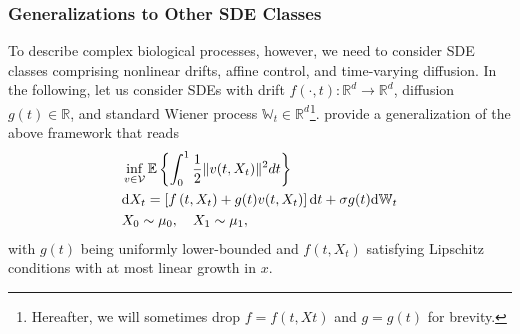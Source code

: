 \subsubsection*{Generalizations to Other SDE Classes}
To describe complex biological processes, however, we need to consider SDE classes comprising nonlinear drifts, affine control, and time-varying diffusion. 
In the following, let us consider SDEs with drift $f(\cdot, t): \mathbb{R}^d \rightarrow \mathbb{R}^d$, diffusion $g(t) \in \mathbb{R}$, and standard Wiener process $\mathbb{W}_t \in \mathbb{R}^d$\footnote{Hereafter, we will sometimes drop $f \equal f(t, Xt)$ and $g \equal g(t)$ for brevity.}. \citet{caluya2021wasserstein, chen2021likelihood} provide a generalization of the above framework that reads
\begin{align}
\label{eq:sb_control_gen}
& \inf _{v \in \mathcal{V}} \mathbb{E}\left\{\int_0^1 \frac{1}{2}\lVert v(t, X_t)\rVert^2 d t\right\}\\
\label{eq:sb_control_constraint_gen}
& \mathrm{d} X_t=\left[f\left(t, X_t\right)+g(t) v(t, X_t)\right] \mathrm{d} t+\sigma g(t) \mathrm{d} \mathbb{W}_t
 \\
\nonumber & X_0 \sim \mu_0, \quad X_1 \sim \mu_1,
\end{align}
with $g(t)$ being uniformly lower-bounded and $f(t, X_t)$ satisfying Lipschitz conditions with at most linear growth in $x$.


